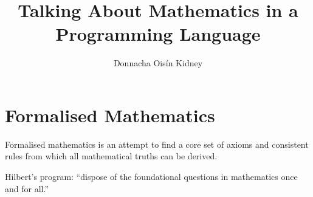 \documentclass[usenames,dvipsnames]{beamer}
\title{Talking About Mathematics in a Programming Language}
\author{Donnacha Oisín Kidney}
\begin{document}
\maketitle
\tableofcontents

\section{Formalised Mathematics}
\begin{frame}
  Formalised mathematics is an attempt to find a core set of axioms and
  consistent rules from which all mathematical truths can be derived.


  Hilbert's program: ``dispose of the foundational questions in mathematics once
  and for all.''
\end{frame}
\end{document}
